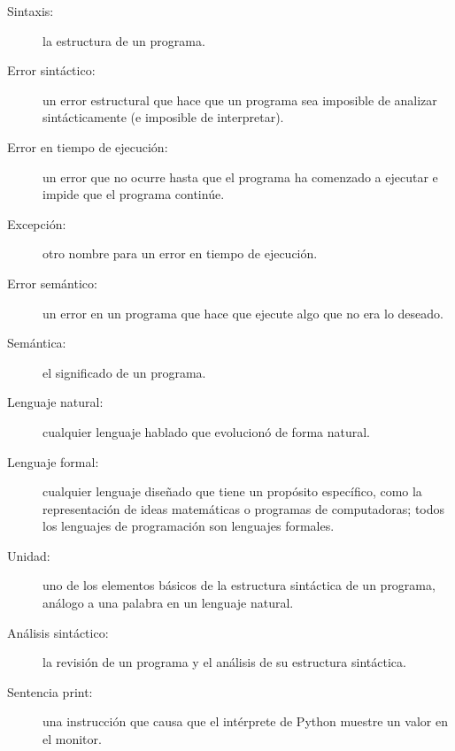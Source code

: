 \begin{description}
	\item[Sintaxis:]  la estructura de un programa.
	
	\item[Error sintáctico:]  un error estructural que hace que un
	programa sea imposible de analizar sintácticamente (e imposible de
	interpretar).
	
	\item[Error en tiempo de ejecución:]  un error que no ocurre hasta
	que el programa ha comenzado a ejecutar e impide que el programa
	continúe.
	
	\item[Excepción:]  otro nombre para un error en tiempo de ejecución.
	
	\item[Error semántico:]   un error en un programa que hace que ejecute
	algo que no era lo deseado.
	
	\item[Semántica:]  el significado de un programa.
	
	\item[Lenguaje natural:]  cualquier lenguaje hablado que evolucionó
	de forma natural.
	
	\item[Lenguaje formal:]  cualquier lenguaje diseñado que tiene un
	propósito específico, como la representación de ideas matemáticas
	o programas de computadoras; todos los lenguajes de programación
	son lenguajes formales.
	
	\item[Unidad:]  uno de los elementos básicos de la estructura
	sintáctica de un programa, análogo a una palabra en un lenguaje
	natural.
	
	\item[Análisis sintáctico:]  la revisión de un programa y el
	análisis de su estructura sintáctica.
	
	\item[Sentencia print:]  una instrucción que causa que el
	intérprete de Python muestre un valor en el monitor.
	
	
\end{description}



